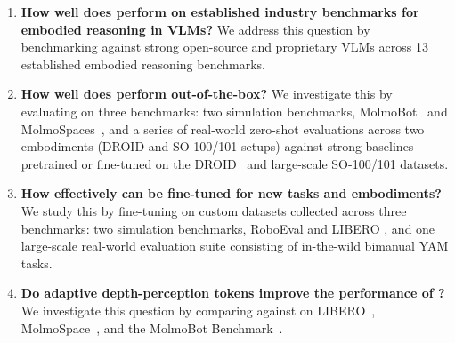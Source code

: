 \begin{enumerate}
    \item \textbf{How well does \molmoer perform on established industry benchmarks for embodied reasoning in VLMs?} We address this question by benchmarking \molmoer against strong open-source and proprietary VLMs across 13 established embodied reasoning benchmarks.



    \item \textbf{How well does \molmoactt perform out-of-the-box?} We investigate this by evaluating \molmoactt on three benchmarks: two simulation benchmarks, MolmoBot~\citep{deshpande2026molmob0t} and MolmoSpaces~\citep{kim2026molmospaces}, and a series of real-world zero-shot evaluations across two embodiments (DROID and SO-100/101 setups) against strong baselines pretrained or fine-tuned on the DROID~\citep{khazatsky2024droid} and large-scale SO-100/101 datasets.


    \item \textbf{How effectively can \molmoactt be fine-tuned for new tasks and embodiments?} We study this by fine-tuning \molmoactt on custom datasets collected across three benchmarks: two simulation benchmarks, RoboEval \citep{wang2025roboeval} and LIBERO \citep{liu2023libero}, and one large-scale real-world evaluation suite consisting of in-the-wild bimanual YAM tasks.

    \item \textbf{Do adaptive depth-perception tokens improve the performance of \molmothink?}
    We investigate this question by comparing \molmoactt against \molmothink on LIBERO~\citep{liu2023libero}, MolmoSpace~\citep{kim2026molmospaces}, and the MolmoBot Benchmark~\citep{deshpande2026molmob0t}.


\end{enumerate}
